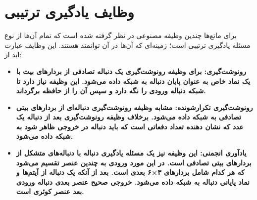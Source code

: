 \section{وظایف یادگیری ترتیبی}
برای ماتع‌ها چندین وظیفه مصنوعی در نظر گرفته شده است که تمام آن‌ها از نوع مسئله یادگیری ترتیبی است؛ زمینه‌ای که آن‌ها در آن توانمند هستند. این وظایف عبارت اند از:
\begin{itemize}
\item \bf{رونوشت‌گیری}:
برای وظیفه رونوشت‌گیری یک دنباله تصادفی از بردارهای بیت با یک نماد خاص به عنوان پایان دنباله به شبکه داده می‌شود. این وظیفه نیاز دارد تا شبکه دنباله ورودی را نگه دارد و سپس آن را از حافظه برگرداند.

\item \bf{رونوشت‌گیری تکرارشونده}:
مشابه وظیفه رونوشت‌گیری دنباله‌ای از بردارهای بیتی تصادفی به شبکه داده می‌شود. برخلاف وظیفه رونوشت‌گیری بعد از دنباله یک عدد که نشان دهنده تعداد دفعاتی است که باید دنباله در خروجی ظاهر شود به شبکه داده می‌شود.

\item \bf{یادآوری انجمنی}:
این وظیفه نیز یک مسئله یادگیری دنباله با دنباله‌های متشکل از بردارهای بیتی تصادفی است. در این مورد ورودی به چندین عنصر تقسیم می‌شود که هر کدام شامل بردارهای ۳×۶ بعدی است. بعد از آنکه یک دنباله از آیتم‌ها و نماد پایانی دنباله به شبکه داده می‌شود. خروجی صحیح عنصر بعدی دنباله ورودی بعد عنصر کوئری است.\cite{collier2018implementing} 

\end{itemize}